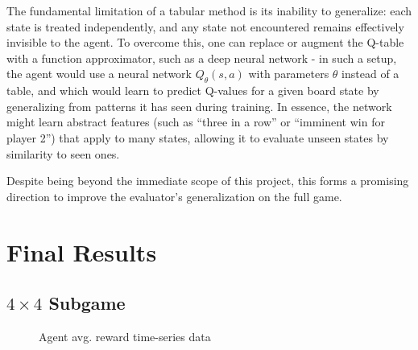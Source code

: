 \documentclass[10pt]{extarticle}
\begin{document}
The fundamental limitation of a tabular method is its inability to generalize: each state is treated independently, and any state not encountered remains effectively invisible to the agent. To overcome this, one can replace or augment the Q-table with a function approximator, such as a deep neural network - in such a setup, the agent would use a neural network $Q_\theta(s,a)$ with parameters $\theta$ instead of a table, and which would learn to predict Q-values for a given board state by generalizing from patterns it has seen during training. In essence, the network might learn abstract features (such as “three in a row” or “imminent win for player 2”) that apply to many states, allowing it to evaluate unseen states by similarity to seen ones. 

Despite being beyond the immediate scope of this project, this forms a promising direction to improve the evaluator's generalization on the full game.

\section{Final Results}

\subsection{$4 \times 4$ Subgame}

\begin{figure}

	\caption{Agent avg. reward time-series data} 
\end{figure}
\end{document}
